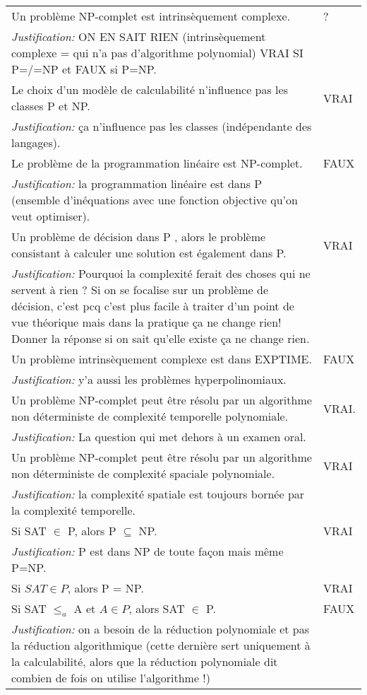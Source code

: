 \begin{longtable}{p{13cm}|l}
     Un problème NP-complet est intrinsèquement complexe. & ? \\
    \textit{Justification:} ON EN SAIT RIEN (intrinsèquement complexe = qui n'a pas d'algorithme polynomial) VRAI SI P=/=NP et FAUX si P=NP. & \\
    \hline
    Le choix d’un modèle de calculabilité n’influence pas les classes P et NP. & VRAI \\
    \textit{Justification:} ça n'influence pas les classes (indépendante des langages). & \\
    \hline
    Le problème de la programmation linéaire est NP-complet. & FAUX \\
    \textit{Justification:} la programmation linéaire est dans P (ensemble d'inéquations avec une fonction objective qu'on veut optimiser). & \\
    \hline
    Un problème de décision dans P , alors le problème consistant à calculer une solution est également dans P. & VRAI \\
    \textit{Justification:} Pourquoi la complexité ferait des choses qui ne servent à rien ? Si on se focalise sur un problème de décision, c'est pcq c'est plus facile à traiter d'un point de vue théorique mais dans la pratique ça ne change rien! Donner la réponse si on sait qu'elle existe ça ne change rien. & \\
    \hline
    Un problème intrinsèquement complexe est dans EXPTIME.  & FAUX \\
    \textit{Justification:} y'a aussi les problèmes hyperpolinomiaux.& \\
    \hline
    Un problème NP-complet peut être résolu par un algorithme non déterministe de complexité temporelle polynomiale. & VRAI. \\
    \textit{Justification:} La question qui met dehors à un examen oral. & \\
    \hline
    Un problème NP-complet peut être résolu par un algorithme non déterministe de complexité spaciale polynomiale. & VRAI \\
    \textit{Justification:}  la complexité spatiale est toujours bornée par la complexité temporelle. & \\
    \hline
    Si SAT $\in$ P, alors P $\subseteq$ NP.& VRAI \\
    \textit{Justification:} P est dans NP de toute façon mais même P=NP. & \\
    \hline
    Si $SAT \in P$, alors P = NP. & VRAI \\
    \hline
    Si SAT $\leq_{a}$ A et $A \in P$, alors SAT $\in$ P.& FAUX \\
    \textit{Justification:} on a besoin de la réduction polynomiale et pas la réduction algorithmique (cette dernière sert uniquement à la calculabilité, alors que la réduction polynomiale dit combien de fois on utilise l'algorithme !) & \\
    \hline

\end{longtable}
